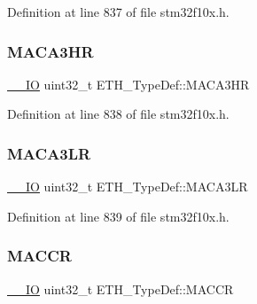Definition at line 837 of file stm32f10x.\+h.

\mbox{\label{struct_e_t_h___type_def_ad4dd976fada7085d87aa017f160e70d4}} 
\subsubsection{\texorpdfstring{M\+A\+C\+A3\+HR}{MACA3HR}}
{\footnotesize\ttfamily \hyperlink{core__sc300_8h_aec43007d9998a0a0e01faede4133d6be}{\+\_\+\+\_\+\+IO} uint32\+\_\+t E\+T\+H\+\_\+\+Type\+Def\+::\+M\+A\+C\+A3\+HR}



Definition at line 838 of file stm32f10x.\+h.

\mbox{\label{struct_e_t_h___type_def_af31f33c1487ae0ee89ac427d9f0f037d}} 
\subsubsection{\texorpdfstring{M\+A\+C\+A3\+LR}{MACA3LR}}
{\footnotesize\ttfamily \hyperlink{core__sc300_8h_aec43007d9998a0a0e01faede4133d6be}{\+\_\+\+\_\+\+IO} uint32\+\_\+t E\+T\+H\+\_\+\+Type\+Def\+::\+M\+A\+C\+A3\+LR}



Definition at line 839 of file stm32f10x.\+h.

\mbox{\label{struct_e_t_h___type_def_a68d7e7c68b5b8adcf7b2b96bc1eea7d9}} 
\subsubsection{\texorpdfstring{M\+A\+C\+CR}{MACCR}}
{\footnotesize\ttfamily \hyperlink{core__sc300_8h_aec43007d9998a0a0e01faede4133d6be}{\+\_\+\+\_\+\+IO} uint32\+\_\+t E\+T\+H\+\_\+\+Type\+Def\+::\+M\+A\+C\+CR}



